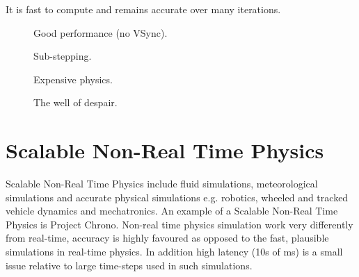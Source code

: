 It is fast to compute and remains accurate over many iterations.





\begin{figure}
	\centering
	
	\caption{Good performance (no VSync).}
\end{figure}

\begin{figure}
	\centering
	
	\caption{Sub-stepping.}
\end{figure}

\begin{figure}
	\centering
	
	\caption{Expensive physics.}
\end{figure}

\begin{figure}
	\centering
	
	\caption{The well of despair.}
\end{figure}

\section{Scalable Non-Real Time Physics}
Scalable Non-Real Time Physics include fluid simulations, meteorological simulations and accurate physical simulations e.g. robotics, wheeled and tracked vehicle dynamics and mechatronics. An example of a Scalable Non-Real Time Physics is Project Chrono. Non-real time physics simulation work very differently from real-time, accuracy is highly favoured as opposed to the fast, plausible simulations in real-time physics. In addition high latency (10s of ms) is a small issue relative to large time-steps used in such simulations.

